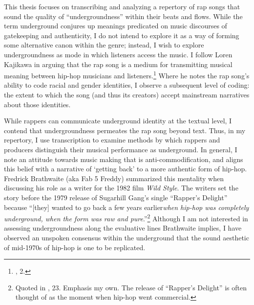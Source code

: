 


This thesis focuses on transcribing and analyzing a repertory of rap songs that sound the quality of ``undergroundness'' within their beats and flows. While the term underground conjures up meanings predicated on music discourses of gatekeeping and authenticity, I do not intend to explore it as a way of forming some alternative canon within the genre; instead, I wish to explore undergroundness as mode in which listeners access the music. I follow Loren Kajikawa in arguing that the rap song is a medium for transmitting musical meaning between hip-hop musicians and listeners.\footnote{\cite{lorenkajikawaSoundingRaceRap2015}, 2.} Where he notes the rap song's ability to code racial and gender identities, I observe a subsequent level of coding: the extent to which the song (and thus its creators) accept mainstream narratives about those identities.

While rappers can communicate underground identity at the textual level, I contend that undergroundness permeates the rap song beyond text. Thus, in my repertory, I use transcription to examine methods by which rappers and producers distinguish their musical performance as underground. In general, I note an attitude towards music making that is anti-commodification, and aligns this belief with a narrative of `getting back' to a more authentic form of hip-hop. Fredrick Brathwaite (aka Fab 5 Freddy) summarized this mentality when discussing his role as a writer for the 1982 film \textit{Wild Style}. The writers set the story before the 1979 release of Sugarhill Gang's single ``Rapper's Delight'' because ``[they] wanted to go back a few years earlier\textellipsis \emph{when hip-hop was completely underground, when the form was raw and pure}.''\footnote{Quoted in \cite{justinawilliamsRhyminStealinMusical2013}, 23. Emphasis my own. The release of ``Rapper's Delight'' is often thought of as the moment when hip-hop went commercial.} Although I am not interested in assessing undergroundness along the evaluative lines Brathwaite implies, I have observed an unspoken consensus within the underground that the sound aesthetic of mid-1970s of hip-hop is one to be replicated.

